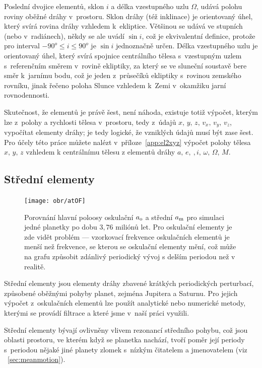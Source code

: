 \documentclass[A4paper, 12pt, oneside]{book}
\begin{document}
Poslední dvojice elementů, sklon $i$ a délka vzestupného uzlu $\Omega$, udává polohu roviny oběžné dráhy v~prostoru. Sklon dráhy (též inklinace) je orientovaný úhel, který svírá rovina dráhy vzhledem k~ekliptice. Většinou se udává ve stupních (nebo v~radiánech), někdy se ale uvádí $\sin i$, což je ekvivalentní definice, protože pro interval $-90^o\leq i \leq 90^o$ je $\sin i$ jednoznačně určen. Délka vzestupného uzlu je orientovaný úhel, který svírá spojnice centrálního tělesa s~vzestupným uzlem s~referenčním směrem v~rovině ekliptiky, za který se ve sluneční soustavě bere směr k~jarnímu bodu, což je jeden z~průsečíků ekliptiky s~rovinou zemského rovníku, jinak řečeno poloha Slunce vzhledem k~Zemi v~okamžiku jarní rovnodennosti.

Skutečnost, že elementů je právě šest, není náhoda, existuje totiž výpočet, kterým lze z~polohy a rychlosti tělesa v~prostoru, tedy z~údajů $x,\, y,\, z,\, v_x,\, v_y,\, v_z$, vypočítat elementy dráhy; je tedy logické, že vzniklých údajů musí být zase šest. Pro účely této práce můžete nalézt v~příloze~\ref{app:el2xyz} výpočet polohy tělesa $x,\,y,\,z$ vzhledem k centrálnímu tělesu z elementů dráhy $a,\,e,~,i,\,\omega,\,\Omega,\,M$.

\subsection{Střední elementy}

\begin{figure}
	\centering
	\texttt{[image: obr/atOF]}
	\caption{Porovnání hlavní poloosy oskulační $a_{\rm o}$ a střední $a_{\rm m}$ pro simulaci jedné planetky po dobu $3,76$ miliónů let. Pro oskulační elementy je zde vidět problém  --- vzorkovací frekvence oskulačních elementů je menší než frekvence, se kterou se oskulační elementy mění, což může na grafu způsobit zdánlivý periodický vývoj s delším periodou než v realitě.} 
	\label{atOF}
\end{figure}

Střední elementy jsou elementy dráhy zbavené krátkých periodických perturbací, způsobené oběžnými pohyby planet, zejména Jupitera a Saturnu. Pro jejich výpočet z~oskulačních elementů lze použít analytické nebo numerické metody, kterými se provádí filtrace a které jsme v~naší práci využili. 

Střední elementy bývají ovlivněny vlivem rezonancí středního pohybu, což jsou oblasti prostoru, ve kterém když se planetka nachází, tvoří poměr její periody s~periodou nějaké jiné planety zlomek s~nízkým čitatelem a jmenovatelem (viz ~\ref{sec:meanmotion}). 
\end{document}
